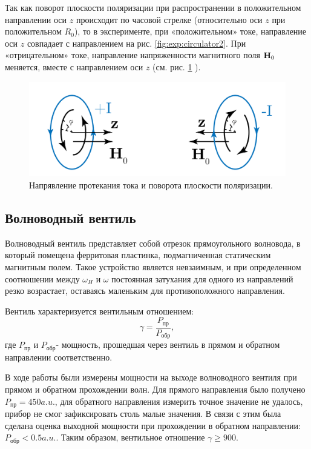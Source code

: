 Так как поворот плоскости поляризации при распространении в положительном направлении оси $z$ происходит по часовой
стрелке (относительно оси $z$ при положительном $R_0$), то в эксперименте, при «положительном» токе, направление оси $z$ совпадает с
направлением на рис. \ref{fig:exp:circulator2}. При «отрицательном» токе, направление напряженности магнитного поля
$\textbf{H}_0$ меняется, вместе с направлением оси $z$ (см. рис. \ref{fig:exp:circulator3} ).
\begin{figure}[h!]
    \centering
    \includegraphics[width = 0.7\linewidth]{imgs/circulator3.pdf}
    \caption{Напрявление протекания тока и поворота плоскости поляризации.}
    \label{fig:exp:circulator3}
\end{figure}
\subsection{Волноводный вентиль}
Волноводный вентиль представляет собой отрезок прямоугольного волновода, в который помещена ферритовая пластинка,
подмагниченная статическим магнитным полем. Такое устройство является невзаимным, и при определенном соотношении между
$\omega_{H}$ и $\omega$ постоянная затухания для одного из направлений резко возрастает, оставаясь маленьким для
противоположного направления.

Вентиль характеризуется вентильным отношением:
\begin{equation}
    \gamma = \frac{P_{\text{пр}}}{P_{\text{обр}}},
    \label{eq:3:1}
\end{equation}
где $P_{\text{пр}}$ и $P_{\text{обр}}$- мощность, прошедшая через вентиль в прямом и обратном направлении
соответственно.

В ходе работы были измерены мощности на выходе волноводного вентиля при прямом и обратном прохождении волн. Для прямого
направления было получено $P_{\text{пр}} = 450 a.u.$, для обратного направления измерить точное значение не удалось,
прибор не смог зафиксировать столь малые значения. В связи с этим была сделана оценка выходной мощности при прохождении
в обратном направлении: $P_{\text{обр}}<0.5 a.u.$. Таким образом, вентильное отношение $\gamma \geq 900$. 

